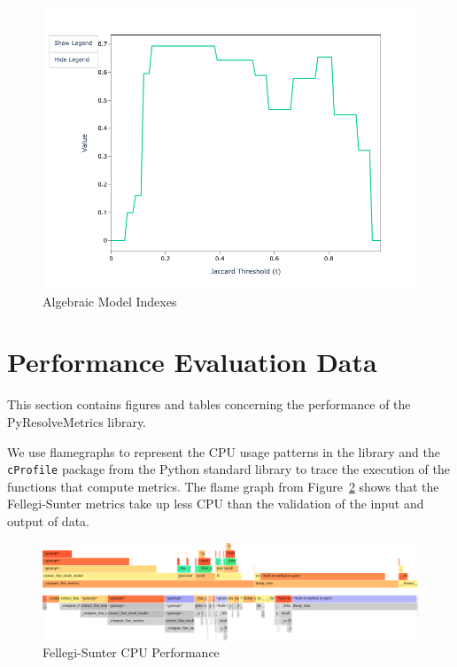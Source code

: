 \documentclass{article}
\begin{document}
\begin{figure}[htbp]
\begin{minipage}{0.32\textwidth}
            \includegraphics[width=\textwidth]{sample-usage/mini-alg-ari}
        \end{minipage}
        \caption{Algebraic Model Indexes}\label{appendix:fig:alg-indexes}
    \end{figure}

    \section{Performance Evaluation Data}\label{appendix:sec:perf}
    This section contains figures and tables concerning the performance of the
    PyResolveMetrics library.

    We use flamegraphs\cite{flamegraphs2013} to represent the CPU usage
    patterns in the library and the \texttt{cProfile} package from the Python
    standard library to trace the execution of the functions that compute
    metrics.
    The flame graph from Figure~\ref{appendix:fig:fs-cpu-perf}
    shows that the Fellegi-Sunter metrics take up less CPU than the validation
    of the input and output of data. 
    \begin{figure}[htbp]
        \centering
        \includegraphics[width=\textwidth]{performance/fs-flamegraph}
        \caption{Fellegi-Sunter CPU Performance}\label{appendix:fig:fs-cpu-perf}
    \end{figure}
\end{document}
